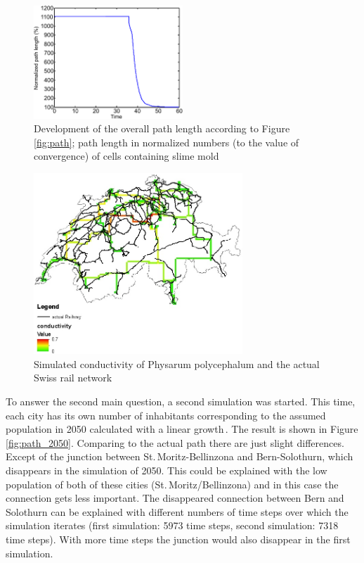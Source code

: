 \documentclass[11pt]{scrartcl}
\begin{document}
\begin{figure}[H]
	\centering
	\includegraphics[width=0.5\textwidth]{figures/plottrail1}
	\caption{Development of the overall path length according to Figure\,\ref{fig:path}; path length in normalized numbers (to the value of convergence) of cells containing slime mold}
	\label{fig:plottrail}
\end{figure}

\begin{figure}[H]
	\centering
	\includegraphics[width=0.7\textwidth]{figures/conductivity_railway}
	\caption{Simulated conductivity of Physarum polycephalum and the actual Swiss rail network}
	\label{fig:conductivity}
\end{figure}

To answer the second main question, a second simulation was started. This time, each city has its own number of inhabitants corresponding to the assumed population in 2050 calculated with a linear growth\,\cite{bfs}. The result is shown in Figure\,\ref{fig:path_2050}. Comparing to the actual path there are just slight differences. Except of the junction between St.\,Moritz-Bellinzona and Bern-Solothurn, which disappears in the simulation of 2050. This could be explained with the low population of both of these cities (St.\,Moritz/Bellinzona) and in this case the connection gets less important. The disappeared connection between Bern and Solothurn can be explained with different numbers of time steps over which the simulation iterates (first simulation: 5973 time steps, second simulation: 7318 time steps). With more time steps the junction would also disappear in the first simulation.
\end{document}
